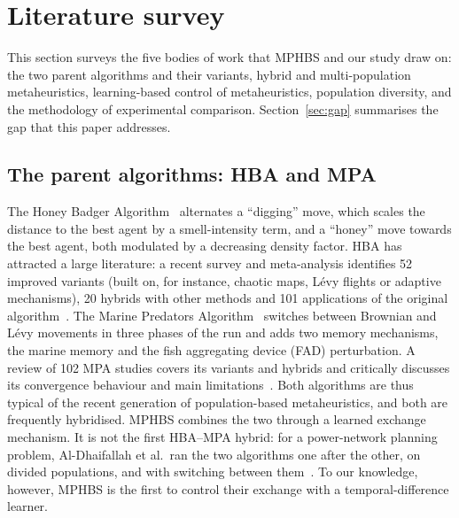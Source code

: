 \documentclass[11pt]{article}
\theoremstyle{definition}
\theoremstyle{remark}
\begin{document}
\section{Literature survey}
\label{sec:related}

This section surveys the five bodies of work that MPHBS and our study draw on: the two parent algorithms and their
variants, hybrid and multi-population metaheuristics, learning-based control of metaheuristics, population diversity, and
the methodology of experimental comparison. Section~\ref{sec:gap} summarises the gap that this paper addresses.

\subsection{The parent algorithms: HBA and MPA}
The Honey Badger Algorithm~\citep{hashim2022hba} alternates a ``digging'' move, which scales the distance to the best
agent by a smell-intensity term, and a ``honey'' move towards the best agent, both modulated by a decreasing density
factor. HBA has attracted a large literature: a recent survey and meta-analysis identifies 52 improved variants (built
on, for instance, chaotic maps, L\'evy flights or adaptive mechanisms), 20 hybrids with other methods and 101
applications of the original algorithm~\citep{hassan2024hba}. The Marine Predators Algorithm~\citep{faramarzi2020mpa} switches between Brownian and L\'evy
movements in three phases of the run and adds two memory mechanisms, the marine memory and the fish aggregating device
(FAD) perturbation. A review of 102 MPA studies covers its variants and hybrids and critically discusses its convergence
behaviour and main limitations~\citep{albetar2023mpa}. Both algorithms are thus
typical of the recent generation of population-based metaheuristics, and both are frequently hybridised. MPHBS combines
the two through a learned exchange mechanism. It is not the first HBA--MPA hybrid: for a power-network planning
problem, Al-Dhaifallah et al.\ ran the two algorithms one after the other, on divided populations, and with switching
between them~\citep{aldhaifallah2024mpahba}. To our knowledge, however, MPHBS is the first to control their exchange with a
temporal-difference learner.
\end{document}
